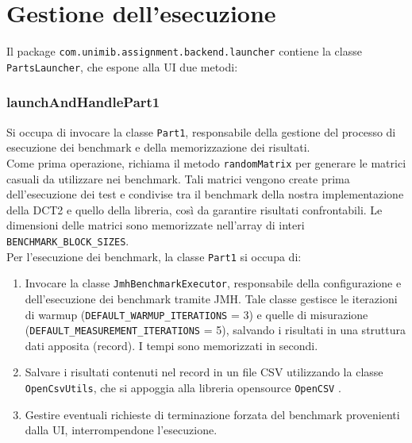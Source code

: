 \section{Gestione dell'esecuzione}

Il package \texttt{com.unimib.assignment.backend.launcher} contiene la classe \texttt{PartsLauncher},
che espone alla UI due metodi: 


\subsubsection{launchAndHandlePart1}
Si occupa di invocare la classe \texttt{Part1}, responsabile della gestione del processo di esecuzione dei 
benchmark e della memorizzazione dei risultati.
\\
Come prima operazione, richiama il metodo \texttt{randomMatrix} per generare le matrici casuali da utilizzare
nei benchmark. Tali matrici vengono create prima dell'esecuzione dei test e condivise tra il benchmark 
della nostra implementazione della DCT2 e quello della libreria, così da garantire risultati confrontabili. 
Le dimensioni delle matrici sono memorizzate nell'array di interi \texttt{BENCHMARK\_BLOCK\_SIZES}.
\\
Per l'esecuzione dei benchmark, la classe \texttt{Part1} si occupa di:
\begin{enumerate}
\item Invocare la classe \texttt{JmhBenchmarkExecutor}, responsabile della configurazione e dell'esecuzione 
dei benchmark tramite JMH. Tale classe gestisce le iterazioni di warmup 
(\texttt{DEFAULT\_WARMUP\_ITERATIONS} = 3) e quelle di misurazione 
(\texttt{DEFAULT\_MEASUREMENT\_ITERATIONS} = 5), salvando i risultati in una struttura dati apposita (record).
I tempi sono memorizzati in secondi.
\item Salvare i risultati contenuti nel record in un file CSV utilizzando la classe \texttt{OpenCsvUtils}, che si appoggia alla libreria opensource \texttt{OpenCSV} \cite{opencsv}.
\item Gestire eventuali richieste di terminazione forzata del benchmark provenienti dalla UI, 
interrompendone l'esecuzione.
\end{enumerate}

